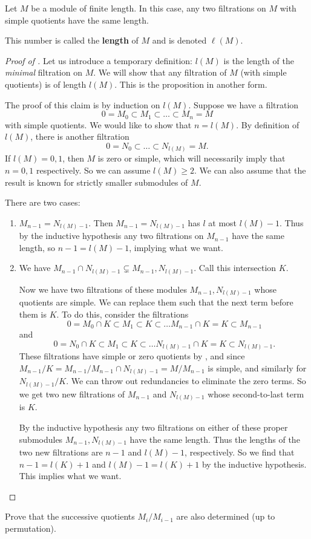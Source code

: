 \begin{theorem}\label{lengthexists} Let $M$ be a module of
finite length.
In this case, any two filtrations
on $M$ with simple quotients have the same length.
\end{theorem} 
\begin{definition} 
This number is called the \textbf{length} of $M$ and is denoted $\ell(M)$.
\end{definition} 
\begin{proof}[Proof of ] 
Let us introduce a temporary definition: $l(M)$ is the length of the
\emph{minimal} filtration on $M$. We will show that any filtration of $M$ (with
simple quotients) is of length
$l(M)$. This is the proposition in another form.

The proof of this claim is by induction on $l(M)$. Suppose we have a filtration
\[ 0 = M_0 \subset M_1 \subset \dots \subset M_n = M  \]
with simple quotients. We would like to show that $n  = l(M)$. By definition of
$l(M)$, there is another filtration
\[ 0 = N_0 \subset \dots \subset N_{l(M)} = M.  \]
If $l(M) = 0,1$, then $M$ is zero or simple, which will necessarily imply that $n=0,1$
respectively. So we can assume $l(M)  \geq 2$. We can also assume that the
result is known for strictly smaller submodules of $M$.

There are two cases:
\begin{enumerate}
\item $M_{n-1} = N_{l(M) -1 } $. Then $M_{n-1} = N_{l(M)-1}$ has $l$ at most
$l(M)-1$. Thus by the inductive hypothesis any two filtrations on $M_{n-1}$
have the same length, so $n-1 = l(M) -1$, implying what we want. 
\item We have $M_{n-1} \cap N_{l(M) - 1} \subsetneq M_{n-1}, N_{l(M)-1}$. 
Call this intersection $K$. 

Now we have two  filtrations of these modules $M_{n-1}, N_{l(M)-1}$ whose
quotients are simple. We can replace them such that the next
term before them is $K$. 
To do this, consider the filtrations
\[ 0 = M_0 \cap K \subset M_1 \subset K \subset \dots M_{n-1} \cap K = K
\subset M_{n-1}  \]
and
\[ 0 = N_0 \cap K \subset M_1 \subset K \subset \dots N_{l(M)-1} \cap K = K
\subset N_{l(M)-1} . \]
These filtrations have simple or zero quotients by
, and since $ M_{n-1}/K =
M_{n-1}/M_{n-1} \cap N_{l(M)-1} = M/M_{n-1}$ is simple, and similarly for
$N_{l(M)-1}/K$. We can throw out redundancies to eliminate
the zero terms. 
So we get two new filtrations of $M_{n-1}$ and $N_{l(M)-1}$ whose second-to-last
term is $K$.

By the
inductive hypothesis any two filtrations on either of these proper submodules $M_{n-1},
N_{l(M)-1} $
have the same length. 
Thus the lengths of the two new filtrations are $n-1$ and $l(M)-1$,
respectively.
So we find that $n-1 = l(K) +1$ and $l(M)-1 = l(K)+1$ by
the inductive hypothesis. This implies what we want.
\end{enumerate}
\end{proof} 

\begin{exercise} 
Prove that the successive quotients $M_i/M_{i-1}$ are also determined (up to
permutation).
\end{exercise} 


